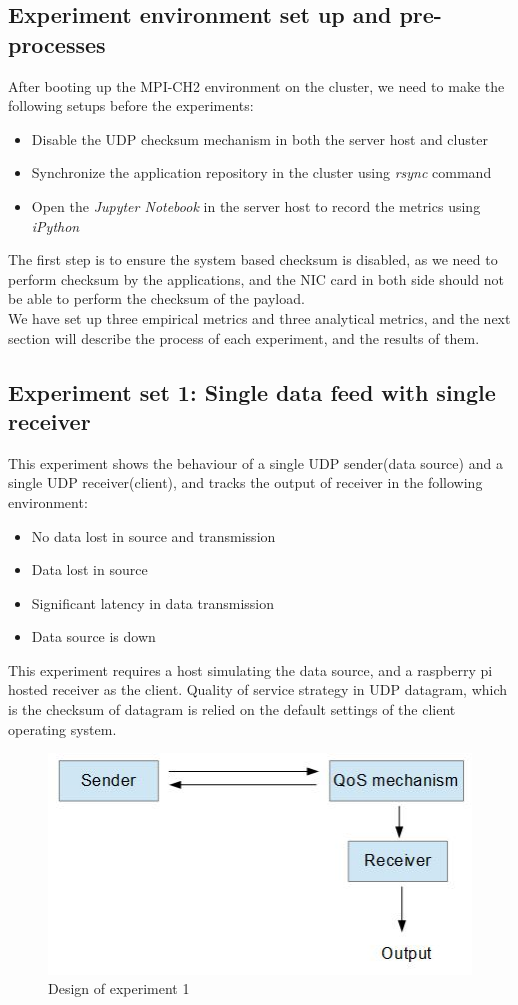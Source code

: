 \documentclass[11pt,openright,a4paper]{report}
\begin{document}
\subsection{Experiment environment set up and pre-processes}
After booting up the MPI-CH2 environment on the cluster, we need to make the following setups before the experiments:
\begin{itemize}
	\item Disable the UDP checksum mechanism in both the server host and cluster
	\item Synchronize the application repository in the cluster using \textit{rsync} command
	\item Open the \textit{Jupyter Notebook} in the server host to record the metrics using \textit{iPython} 
\end{itemize}
The first step is to ensure the system based checksum is disabled, as we need to perform checksum by the applications, and the NIC card in both side should not be able to perform the checksum of the payload.\\
We have set up three empirical metrics and three analytical metrics, and the next section will describe the process of each experiment, and the results of them.

\subsection{Experiment set 1: Single data feed with single receiver}
This experiment shows the behaviour of a single UDP sender(data source) and a single UDP receiver(client), and tracks the output of receiver in the following environment:
\begin{itemize}
	\item No data lost in source and transmission
	\item Data lost in source
	\item Significant latency in data transmission
	\item Data source is down
\end{itemize} 
This experiment requires a host simulating the data source, and a raspberry pi hosted receiver as the client. Quality of service strategy in UDP datagram, which is the checksum of datagram is relied on the default settings of the client operating system.\\
\begin{figure}[H]
\centering
\includegraphics[width=0.5\linewidth]{picture/Exp1}
\caption{Design of experiment 1}
\label{fig:Exp1}
\end{figure}
\end{document}
